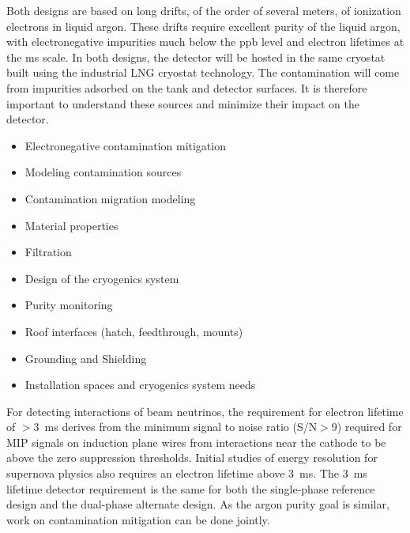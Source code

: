 Both designs are based on long drifts, of the order of several meters,
of ionization electrons in liquid argon. These drifts require
excellent purity of the liquid argon, with electronegative impurities
much below the ppb level and electron lifetimes at the ms scale. In
both designs, the detector will be hosted in the same cryostat built
using the industrial LNG cryostat technology. The contamination will
come from impurities adsorbed on the tank and detector surfaces. It is
therefore important to understand these sources and minimize their
impact on the detector.
\begin{itemize}
\item Electronegative contamination mitigation	
\item Modeling contamination sources
\item Contamination migration modeling
\item Material properties
\item Filtration	
\item Design of the cryogenics system
\item Purity monitoring	
\item Roof interfaces (hatch, feedthrough, mounts)	
\item Grounding and Shielding
\item Installation spaces and cryogenics system needs	
\end{itemize}



For detecting interactions of beam neutrinos, the requirement for
electron lifetime of $>$3~ms derives from the minimum signal to noise
ratio (S/N$>$9) required for MIP signals on induction plane wires from
interactions near the cathode to be above the zero suppression
thresholds.  Initial studies of energy resolution for supernova physics
also requires an electron lifetime above 3~ms.  The 3~ms lifetime
detector requirement is the same for both the single-phase reference
design and the dual-phase alternate design.  As the argon purity goal
is similar, work on contamination mitigation can be done jointly.

